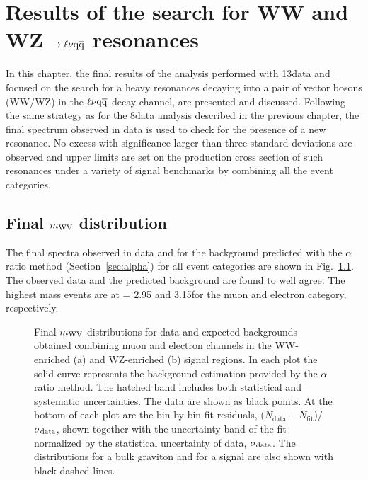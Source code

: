 \chapter{Results of the search for WW and WZ $\to\ell\nu\mathrm{q}\overline{\mathrm{q}}$ resonances}
\label{ch:results13}

In this chapter, the final results of the analysis performed with 13\TeV data and focused on the search for a heavy resonances decaying into a pair of vector bosons (WW/WZ)
in the $\ell\nu\mathrm{q}\overline{\mathrm{q}}$ decay channel, are presented and discussed.
Following the same strategy as for the 8\TeV data analysis described in the previous chapter, the final \mWV spectrum observed in data is used to check for the presence of a new resonance.
No excess with significance larger than three standard deviations are observed and upper limits are set on the production cross section of such resonances under a variety of signal benchmarks by combining all the event categories.

\section{Final $m_{\rm WV}$ distribution}

The final \mWV spectra observed in data and for the background predicted with the $\alpha$ ratio method (Section~\ref{sec:alpha}) for all event categories are shown in Fig.~\ref{fig:mWV-final}.
The observed data and the predicted background are found to well agree. The highest mass events are at \mWV = 2.95 and 3.15\TeV for the muon and electron category, respectively.

\begin{figure}[!htb]
\centering
{}
\caption{%
Final $m_{\rm WV}$ distributions for data and expected backgrounds obtained combining muon and electron channels in the WW-enriched (a) and WZ-enriched (b) signal regions.
In each plot the solid curve represents the background estimation provided by the $\alpha$ ratio method.
The hatched band includes both statistical and systematic uncertainties.
The data are shown as black points. At the bottom of each plot are the bin-by-bin fit residuals, ($N_\mathrm{data} - N_\mathrm{fit}$)/$\sigma_{\rm data}$, shown together with the uncertainty band of the fit normalized by the statistical uncertainty of data, $\sigma_{\rm data}$. The distributions for a bulk graviton and for a \Wpr signal are also shown with black dashed lines.}
\label{fig:mWV-final}
\end{figure}

